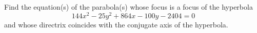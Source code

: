 Find the equation(s) of the parabola(s) whose focus is a focus of the hyperbola \[
144x^2 - 25y^2 + 864x - 100y - 2404 = 0
\] and whose directrix coincides with the conjugate axis of the hyperbola.
